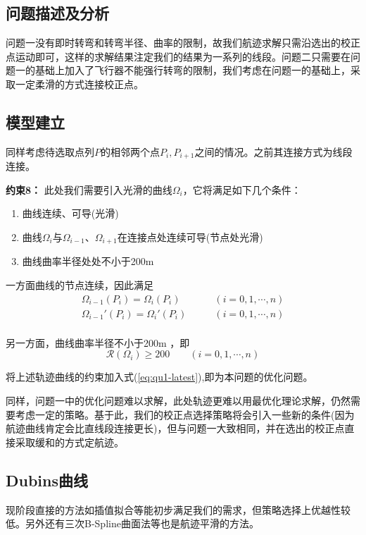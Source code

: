\subsection{问题描述及分析}
问题一没有即时转弯和转弯半径、曲率的限制，故我们航迹求解只需沿选出的校正点运动即可，这样的求解结果注定我们的结果为一系列的线段。问题二只需要在问题一的基础上加入了飞行器不能强行转弯的限制，我们考虑在问题一的基础上，采取一定柔滑的方式连接校正点。

\subsection{模型建立}
同样考虑待选取点列$P$的相邻两个点$P_i,P_{i+1}$之间的情况。之前其连接方式为线段连接。

\noindent \textbf{约束8：} 此处我们需要引入光滑的曲线$\Omega_i$，它将满足如下几个条件：
\begin{enumerate}
	\item 曲线连续、可导(光滑)
	\item 曲线$\Omega_i$与$\Omega_{i-1}$、$\Omega_{i+1}$在连接点处连续可导(节点处光滑)
	\item 曲线曲率半径处处不小于200m
\end{enumerate}

一方面曲线的节点连续，因此满足
\begin{equation}
\begin{aligned}
    \Omega_{i-1}(P_i) = \Omega_{i}(P_i)  &\qquad  (i =0,1,\cdots,n ) \\
    \Omega_{i-1}'(P_i) = \Omega_{i}'(P_i) &\qquad  (i =0,1,\cdots,n )  \\
\end{aligned}
\end{equation}

另一方面，曲线曲率半径不小于200m ，即
\begin{equation}
    \mathcal{R}(\Omega_{i}) \geq 200 \qquad (i =0,1,\cdots,n )
\end{equation}

将上述轨迹曲线的约束加入式(\ref{eq:qu1-latest}),即为本问题的优化问题。

同样，问题一中的优化问题难以求解，此处轨迹更难以用最优化理论求解，仍然需要考虑一定的策略。基于此，我们的校正点选择策略将会引入一些新的条件(因为航迹曲线肯定会比直线段连接更长)，但与问题一大致相同，并在选出的校正点直接采取缓和的方式定航迹。

\subsection{Dubins曲线}
现阶段直接的方法如插值拟合等能初步满足我们的需求，但策略选择上优越性较低。另外还有三次B-Spline曲面法\cite{Dubins}等也是航迹平滑的方法。

